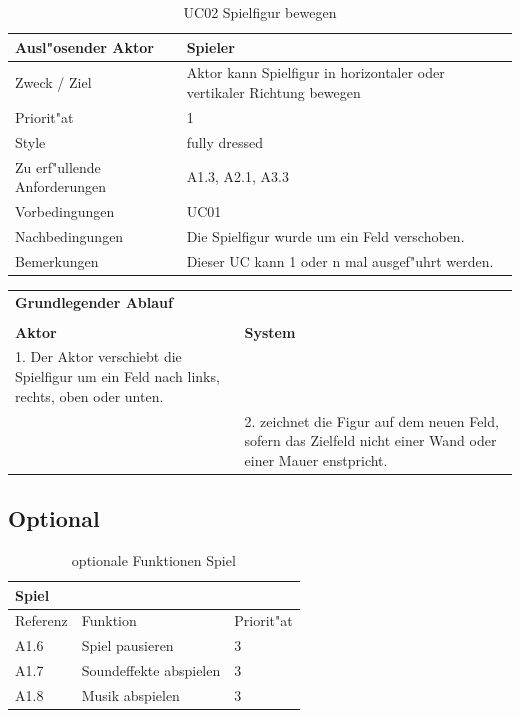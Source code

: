 \begin{table}[H]
  \begin{center}
    \begin{tabular}{|p{40mm}|p{90mm}|}
    \hline Ausl"osender Aktor & Spieler \\
    \hline Zweck / Ziel & Aktor kann Spielfigur in horizontaler oder vertikaler Richtung bewegen \\
    \hline Priorit"at & 1\\
    \hline Style & fully dressed \\
    \hline Zu erf"ullende Anforderungen & A1.3, A2.1, A3.3 \\
    \hline Vorbedingungen & UC01 \\
    \hline Nachbedingungen & Die Spielfigur wurde um ein Feld verschoben.\\
    \hline Bemerkungen & Dieser UC kann 1 oder n mal ausgef"uhrt werden. \\
    \hline
    \end{tabular}
  \end{center}
  \caption{UC02 Spielfigur bewegen}
\end{table}


\begin{center}
  \begin{tabular}{p{65mm} p{65mm}}
  \multicolumn{2}{l}{\textbf{Grundlegender Ablauf}} \\
  & \\
  \textbf{Aktor} & \textbf{System} \\
  1. Der Aktor verschiebt die Spielfigur um ein Feld nach links, rechts, oben oder unten. & \\
  & 2. zeichnet die Figur auf dem neuen Feld, sofern das Zielfeld nicht einer Wand oder einer Mauer enstpricht. \\
  \end{tabular}
\end{center}



\subsection{Optional}


\begin{table}[H]
  \begin{center}
    \begin{tabular}{|p{20mm}|p{85mm}|p{20mm}|}
    \multicolumn{3}{l}{\textbf{Spiel}} \\
    \hline Referenz & Funktion & Priorit"at \\
    \hline A1.6 & Spiel pausieren & 3 \\
    \hline A1.7 & Soundeffekte abspielen & 3 \\
    \hline A1.8 & Musik abspielen & 3 \\
    \hline
    \end{tabular}
  \end{center}
  \caption{optionale Funktionen Spiel}
\end{table}



